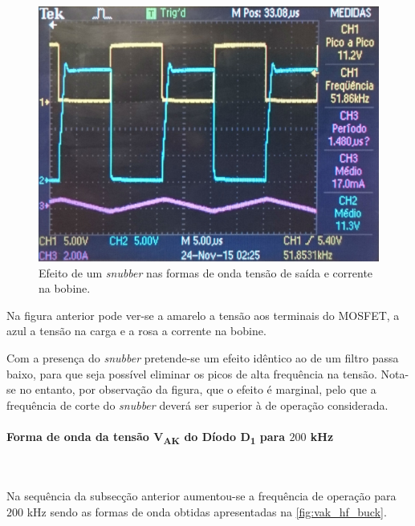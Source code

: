 \documentclass[a4paper,11pt]{article}
\numberwithin{equation}{section}
\begin{document}
\begin{figure}[H]
	\centering
	\includegraphics[keepaspectratio=true, scale=0.175]{img/figs/snubber_buck}
	\caption{Efeito de um \textit{snubber} nas formas de onda tensão de saída e corrente na bobine.}
	\label{fig:snubber_buck}
	\vspace{-0.8em}
\end{figure}

Na figura anterior pode ver-se a amarelo a tensão aos terminais do MOSFET, a azul a tensão na carga e a rosa a corrente na bobine.

Com a presença do \textit{snubber} pretende-se um efeito idêntico ao de um filtro passa baixo, para que seja possível eliminar os picos de alta frequência na tensão. Nota-se no entanto, por observação da figura, que o efeito é marginal, pelo que a frequência de corte do \textit{snubber} deverá ser superior à de operação considerada.

\paragraph{Forma de onda da tensão V\textsubscript{AK} do Díodo D\textsubscript{1} para $200$ kHz}\mbox{}\

Na sequência da subsecção anterior aumentou-se a frequência de operação para $200$ kHz sendo as formas de onda obtidas apresentadas na \autoref{fig:vak_hf_buck}.
\end{document}
